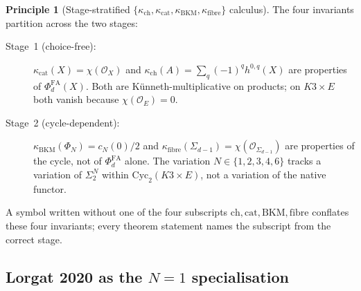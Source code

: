 \documentclass[11pt]{amsart}
\providecommand{\cO}{\mathcal{O}}
\providecommand{\Cyc}{\mathrm{Cyc}}
\providecommand{\kch}{\kappa_{\mathrm{ch}}}
\providecommand{\kcat}{\kappa_{\mathrm{cat}}}
\providecommand{\kBKM}{\kappa_{\mathrm{BKM}}}
\providecommand{\kfib}{\kappa_{\mathrm{fibre}}}
\providecommand{\PhiFA}{\Phi^{\mathrm{FA}}}
\theoremstyle{plain}
\theoremstyle{definition}
\newtheorem{principle}[theorem]{Principle}
\theoremstyle{remark}
\begin{document}
\begin{principle}[Stage-stratified $\{\kch,\kcat,\kBKM,\kfib\}$ calculus]
\label{prin:kappa-stage-split}
The four invariants partition across the two stages:
\begin{description}
\item[Stage~1 (choice-free):]
$\kcat(X)=\chi(\cO_X)$ and $\kch(A)=\sum_q(-1)^q h^{0,q}(X)$ are
properties of $\PhiFA_d(X)$. Both are K\"unneth-multiplicative on
products; on $K3\times E$ both vanish because $\chi(\cO_E)=0$.
\item[Stage~2 (cycle-dependent):]
$\kBKM(\Phi_N)=c_N(0)/2$ and $\kfib(\Sigma_{d-1})=\chi(\cO_{\Sigma_{d-1}})$
are properties of the cycle, not of $\PhiFA_d$ alone. The variation
$N\in\{1,2,3,4,6\}$ tracks a variation of $\Sigma_2^N$ within
$\Cyc_2(K3\times E)$, not a variation of the native functor.
\end{description}
A symbol written without one of the four subscripts
$\mathrm{ch},\mathrm{cat},\mathrm{BKM},\mathrm{fibre}$ conflates these
four invariants; every theorem statement names the subscript from the
correct stage.
\end{principle}

\subsection{Lorgat 2020 as the $N=1$ specialisation}
\end{document}
